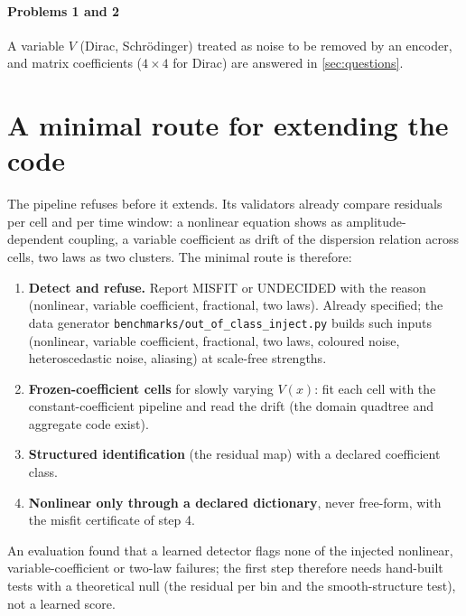 \documentclass[11pt]{article}
\theoremstyle{plain}
\theoremstyle{definition}
\theoremstyle{remark}
\newcommand{\lab}[1]{\textsf{#1}}           %
\newcommand{\MIS}{\lab{MISFIT}}
\newcommand{\UND}{\lab{UNDECIDED}}
\begin{document}
\paragraph{Problems 1 and 2} A variable $V$ (Dirac, Schr\"odinger) treated as noise to be removed by an encoder, and matrix coefficients ($4\times4$ for Dirac) are answered in \cref{sec:questions}.



\section{A minimal route for extending the code}\label{sec:route}
The pipeline refuses before it extends. Its validators already compare residuals per cell and per time window: a nonlinear equation shows as amplitude-dependent coupling, a variable coefficient as drift of the dispersion relation across cells, two laws as two clusters. The minimal route is therefore:
\begin{enumerate}
\item \textbf{Detect and refuse.} Report \MIS{} or \UND{} with the reason (nonlinear, variable coefficient, fractional, two laws). Already specified; the data generator \texttt{benchmarks/out\_of\_class\_inject.py} builds such inputs (nonlinear, variable coefficient, fractional, two laws, coloured noise, heteroscedastic noise, aliasing) at scale-free strengths.
\item \textbf{Frozen-coefficient cells} for slowly varying $V(x)$: fit each cell with the constant-coefficient pipeline and read the drift (the domain quadtree and aggregate code exist).
\item \textbf{Structured identification} (the residual map) with a declared coefficient class.
\item \textbf{Nonlinear only through a declared dictionary}, never free-form, with the misfit certificate of step 4.
\end{enumerate}
An evaluation found that a learned detector flags none of the injected nonlinear, variable-coefficient or two-law failures; the first step therefore needs hand-built tests with a theoretical null (the residual per bin and the smooth-structure test), not a learned score.


\end{document}
